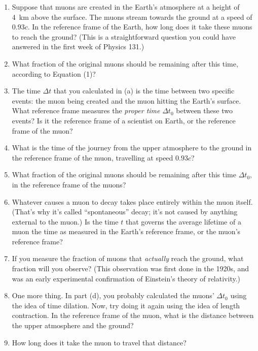 \begin{enumerate}[labparts]
\item   
Suppose that muons are created in the Earth's atmosphere at a height of 4~km above the surface.  The muons stream towards the ground at a speed of $0.93c$.
In the reference frame of the Earth, how long does it take these muons to reach the ground?
(This is a straightforward question you could have answered in the first week of Physics 131.)
\answerspace{0.8in}

\item What fraction of the original muons should be remaining after this time, according to Equation (1)? 
\answerspace{0.6in}

\item The time $\Delta t$ that you calculated in (a) is the time between two specific events: the muon being created and the muon hitting the Earth's surface.  What reference frame measures the \textit{proper time} $\Delta t_0$ between these two events?  Is it the reference frame of a scientist on Earth, or the reference frame of the muon?
\answerspace{0.4in}

\item What is the time of the journey from the upper atmosphere to the ground in the reference frame of the muon, travelling at speed $0.93c$?
\answerspace{0.8in}

\item What fraction of the original muons should be remaining after this time $\Delta t_0$, in the reference frame of the muons?
\answerspace{0.6in}

\item Whatever causes a muon to decay takes place entirely within the muon itself.  (That's why it's called ``spontaneous'' decay; it's not caused by anything external to the muon.)  
Is the time $t$ that governs the average lifetime of a muon the time as measured in the Earth's reference frame, or the muon's reference frame?  
\answerspace{0.4in}

\item If you measure the fraction of muons that \textit{actually} reach the ground, what fraction will you observe?
(This observation was first done in the 1920s, and was an early experimental confirmation of Einstein's theory of relativity.)
\answerspace{0.4in}

\item One more thing.  In part (d), you probably calculated the muons' $\Delta t_0$ using the idea of time dilation.  Now, try doing it again using the idea of length contraction.  In the reference frame of the muon, what is the distance between the upper atmosphere and the ground?
\answerspace{0.8in}

\item How long does it take the muon to travel that distance?
\answerspace{0.6in}

\end{enumerate}

